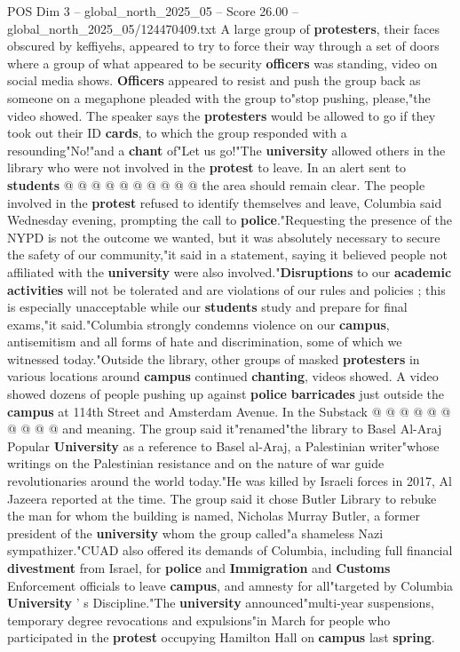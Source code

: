 \begin{textsample}{POS Dim 3 – global\_north\_2025\_05 – Score 26.00 – global\_north\_2025\_05/124470409.txt}
A large group of \textbf{protesters}, their faces obscured by keffiyehs, appeared to try to force their way through a set of doors where a group of what appeared to be security \textbf{officers} was standing, video on social media shows. \textbf{Officers} appeared to resist and push the group back as someone on a megaphone pleaded with the group to"stop pushing, please,"the video showed.
The speaker says the \textbf{protesters} would be allowed to go if they took out their ID \textbf{cards}, to which the group responded with a resounding"No!"and a \textbf{chant} of"Let us go!"The \textbf{university} allowed others in the library who were not involved in the \textbf{protest} to leave.
In an alert sent to \textbf{students} @ @ @ @ @ @ @ @ @ @ the area should remain clear.
The people involved in the \textbf{protest} refused to identify themselves and leave, Columbia said Wednesday evening, prompting the call to \textbf{police}."Requesting the presence of the NYPD is not the outcome we wanted, but it was absolutely necessary to secure the safety of our community,"it said in a statement, saying it believed people not affiliated with the \textbf{university} were also involved."\textbf{Disruptions} to our \textbf{academic} \textbf{activities} will not be tolerated and are violations of our rules and policies ; this is especially unacceptable while our \textbf{students} study and prepare for final exams,"it said."Columbia strongly condemns violence on our \textbf{campus}, antisemitism and all forms of hate and discrimination, some of which we witnessed today."Outside the library, other groups of masked \textbf{protesters} in various locations around \textbf{campus} continued \textbf{chanting}, videos showed.
A video showed dozens of people pushing up against \textbf{police} \textbf{barricades} just outside the \textbf{campus} at 114th Street and Amsterdam Avenue.
In the Substack @ @ @ @ @ @ @ @ @ @ and meaning.
The group said it"renamed"the library to Basel Al-Araj Popular \textbf{University} as a reference to Basel al-Araj, a Palestinian writer"whose writings on the Palestinian resistance and on the nature of war guide revolutionaries around the world today."He was killed by Israeli forces in 2017, Al Jazeera reported at the time.
The group said it chose Butler Library to rebuke the man for whom the building is named, Nicholas Murray Butler, a former president of the \textbf{university} whom the group called"a shameless Nazi sympathizer."CUAD also offered its demands of Columbia, including full financial \textbf{divestment} from Israel, for \textbf{police} and \textbf{Immigration} and \textbf{Customs} Enforcement officials to leave \textbf{campus}, and amnesty for all"targeted by Columbia \textbf{University} ' s Discipline."The \textbf{university} announced"multi-year suspensions, temporary degree revocations and expulsions"in March for people who participated in the \textbf{protest} occupying Hamilton Hall on \textbf{campus} last \textbf{spring}.

\end{textsample}
